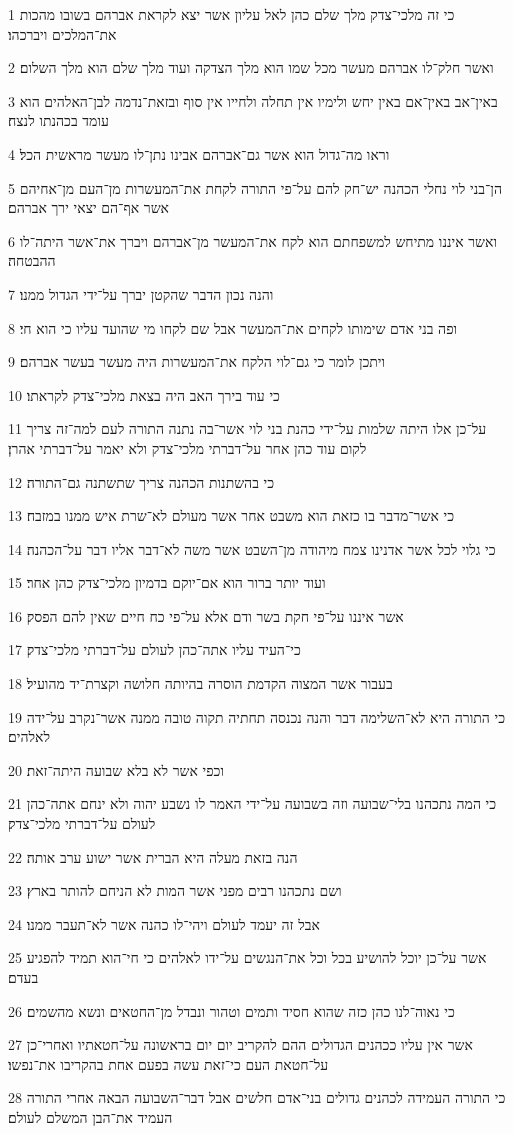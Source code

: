 \par 1 כי זה מלכי־צדק מלך שלם כהן לאל עליון אשר יצא לקראת אברהם בשובו מהכות את־המלכים ויברכהו׃
\par 2 ואשר חלק־לו אברהם מעשר מכל שמו הוא מלך הצדקה ועוד מלך שלם הוא מלך השלום׃
\par 3 באין־אב באין־אם באין יחש ולימיו אין תחלה ולחייו אין סוף ובזאת־נדמה לבן־האלהים הוא עומד בכהנתו לנצח׃
\par 4 וראו מה־גדול הוא אשר גם־אברהם אבינו נתן־לו מעשר מראשית הכל׃
\par 5 הן־בני לוי נחלי הכהנה יש־חק להם על־פי התורה לקחת את־המעשרות מן־העם מן־אחיהם אשר אף־הם יצאי ירך אברהם׃
\par 6 ואשר איננו מתיחש למשפחתם הוא לקח את־המעשר מן־אברהם ויברך את־אשר היתה־לו ההבטחה׃
\par 7 והנה נכון הדבר שהקטן יברך על־ידי הגדול ממנו׃
\par 8 ופה בני אדם שימותו לקחים את־המעשר אבל שם לקחו מי שהועד עליו כי הוא חי׃
\par 9 ויתכן לומר כי גם־לוי הלקח את־המעשרות היה מעשר בעשר אברהם׃
\par 10 כי עוד בירך האב היה בצאת מלכי־צדק לקראתו׃
\par 11 על־כן אלו היתה שלמות על־ידי כהנת בני לוי אשר־בה נתנה התורה לעם למה־זה צריך לקום עוד כהן אחר על־דברתי מלכי־צדק ולא יאמר על־דברתי אהרן׃
\par 12 כי בהשתנות הכהנה צריך שתשתנה גם־התורה׃
\par 13 כי אשר־מדבר בו כזאת הוא משבט אחר אשר מעולם לא־שרת איש ממנו במזבח׃
\par 14 כי גלוי לכל אשר אדנינו צמח מיהודה מן־השבט אשר משה לא־דבר אליו דבר על־הכהנה׃
\par 15 ועוד יותר ברור הוא אם־יוקם בדמיון מלכי־צדק כהן אחר׃
\par 16 אשר איננו על־פי חקת בשר ודם אלא על־פי כח חיים שאין להם הפסק׃
\par 17 כי־העיד עליו אתה־כהן לעולם על־דברתי מלכי־צדק׃
\par 18 בעבור אשר המצוה הקדמת הוסרה בהיותה חלושה וקצרת־יד מהועיל׃
\par 19 כי התורה היא לא־השלימה דבר והנה נכנסה תחתיה תקוה טובה ממנה אשר־נקרב על־ידה לאלהים׃
\par 20 וכפי אשר לא בלא שבועה היתה־זאת׃
\par 21 כי המה נתכהנו בלי־שבועה וזה בשבועה על־ידי האמר לו נשבע יהוה ולא ינחם אתה־כהן לעולם על־דברתי מלכי־צדק׃
\par 22 הנה בזאת מעלה היא הברית אשר ישוע ערב אותה׃
\par 23 ושם נתכהנו רבים מפני אשר המות לא הניחם להותר בארץ׃
\par 24 אבל זה יעמד לעולם ויהי־לו כהנה אשר לא־תעבר ממנו׃
\par 25 אשר על־כן יוכל להושיע בכל וכל את־הנגשים על־ידו לאלהים כי חי־הוא תמיד להפגיע בעדם׃
\par 26 כי נאוה־לנו כהן כזה שהוא חסיד ותמים וטהור ונבדל מן־החטאים ונשא מהשמים׃
\par 27 אשר אין עליו ככהנים הגדולים ההם להקריב יום יום בראשונה על־חטאתיו ואחרי־כן על־חטאת העם כי־זאת עשה בפעם אחת בהקריבו את־נפשו׃
\par 28 כי התורה העמידה לכהנים גדולים בני־אדם חלשים אבל דבר־השבועה הבאה אחרי התורה העמיד את־הבן המשלם לעולם׃


